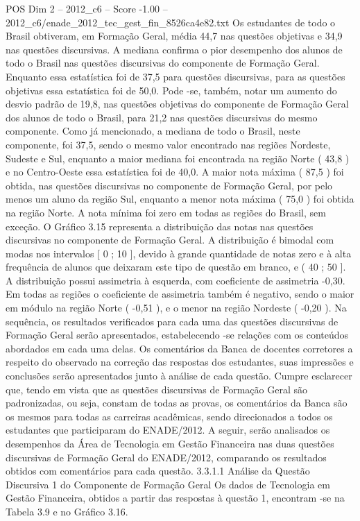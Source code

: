 \begin{textsample}{POS Dim 2 – 2012\_c6 – Score -1.00 – 2012\_c6/enade\_2012\_tec\_gest\_fin\_8526ca4e82.txt}
Os estudantes de todo o Brasil obtiveram, em Formação Geral, média 44,7 nas questões objetivas e 34,9 nas questões discursivas.
A mediana confirma o pior desempenho dos alunos de todo o Brasil nas questões discursivas do componente de Formação Geral.
Enquanto essa estatística foi de 37,5 para questões discursivas, para as questões objetivas essa estatística foi de 50,0.
Pode -se, também, notar um aumento do desvio padrão de 19,8, nas questões objetivas do componente de Formação Geral dos alunos de todo o Brasil, para 21,2 nas questões discursivas do mesmo componente.
Como já mencionado, a mediana de todo o Brasil, neste componente, foi 37,5, sendo o mesmo valor encontrado nas regiões Nordeste, Sudeste e Sul, enquanto a maior mediana foi encontrada na região Norte ( 43,8 ) e no Centro-Oeste essa estatística foi de 40,0.
A maior nota máxima ( 87,5 ) foi obtida, nas questões discursivas no componente de Formação Geral, por pelo menos um aluno da região Sul, enquanto a menor nota máxima ( 75,0 ) foi obtida na região Norte.
A nota mínima foi zero em todas as regiões do Brasil, sem exceção.
O Gráfico 3.15 representa a distribuição das notas nas questões discursivas no componente de Formação Geral.
A distribuição é bimodal com modas nos intervalos [ 0 ; 10 ], devido à grande quantidade de notas zero e à alta frequência de alunos que deixaram este tipo de questão em branco, e ( 40 ; 50 ].
A distribuição possui assimetria à esquerda, com coeficiente de assimetria -0,30.
Em todas as regiões o coeficiente de assimetria também é negativo, sendo o maior em módulo na região Norte ( -0,51 ), e o menor na região Nordeste ( -0,20 ).
Na sequência, os resultados verificados para cada uma das questões discursivas de Formação Geral serão apresentados, estabelecendo -se relações com os conteúdos abordados em cada uma delas.
Os comentários da Banca de docentes corretores a respeito do observado na correção das respostas dos estudantes, suas impressões e conclusões serão apresentados junto à análise de cada questão.
Cumpre esclarecer que, tendo em vista que as questões discursivas de Formação Geral são padronizadas, ou seja, constam de todas as provas, os comentários da Banca são os mesmos para todas as carreiras acadêmicas, sendo direcionados a todos os estudantes que participaram do ENADE/2012.
A seguir, serão analisados os desempenhos da Área de Tecnologia em Gestão Financeira nas duas questões discursivas de Formação Geral do ENADE/2012, comparando os resultados obtidos com comentários para cada questão. 3.3.1.1 Análise da Questão Discursiva 1 do Componente de Formação Geral Os dados de Tecnologia em Gestão Financeira, obtidos a partir das respostas à questão 1, encontram -se na Tabela 3.9 e no Gráfico 3.16.

\end{textsample}
